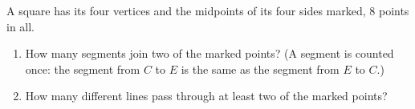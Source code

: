 A square has its four vertices and the midpoints of its four sides marked, $8$ points in all.
\begin{enumerate}
\item[(a)] How many segments join two of the marked points? (A segment is counted once: the segment from $C$ to $E$ is the same as the segment from $E$ to $C$.)
\item[(b)] How many different lines pass through at least two of the marked points?
\end{enumerate}

